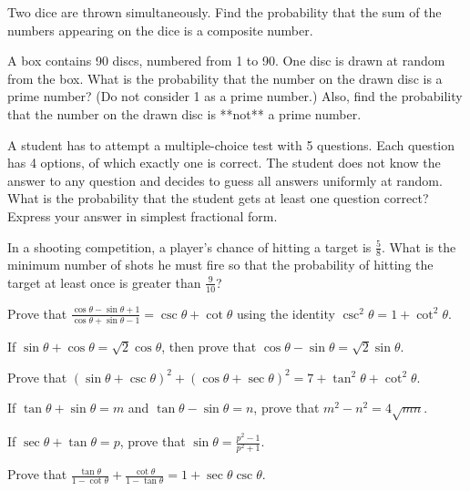 \documentclass[12pt,a4paper]{exam}
\begin{document}
\begin{questions}
\question[5] Two dice are thrown simultaneously. Find the probability that the sum of the numbers appearing on the dice is a composite number.
\vspace{0.15cm}

\question[5] A box contains 90 discs, numbered from 1 to 90. One disc is drawn at random from the box. What is the probability that the number on the drawn disc is a prime number? (Do not consider 1 as a prime number.) Also, find the probability that the number on the drawn disc is **not** a prime number.
\vspace{0.15cm}

\question[5] A student has to attempt a multiple-choice test with 5 questions. Each question has 4 options, of which exactly one is correct. The student does not know the answer to any question and decides to guess all answers uniformly at random. What is the probability that the student gets at least one question correct? Express your answer in simplest fractional form.
\vspace{0.15cm}

\question[5] In a shooting competition, a player's chance of hitting a target is $\frac{5}{8}$. What is the minimum number of shots he must fire so that the probability of hitting the target at least once is greater than $\frac{9}{10}$?
\vspace{0.15cm}

\question[5] Prove that $\frac{\cos \theta - \sin \theta + 1}{\cos \theta + \sin \theta - 1} = \csc \theta + \cot \theta$ using the identity $\csc^2 \theta = 1 + \cot^2 \theta$.
\vspace{0.15cm}

\question[5] If $\sin \theta + \cos \theta = \sqrt{2} \cos \theta$, then prove that $\cos \theta - \sin \theta = \sqrt{2} \sin \theta$.
\vspace{0.15cm}

\question[5] Prove that $(\sin \theta + \csc \theta)^2 + (\cos \theta + \sec \theta)^2 = 7 + \tan^2 \theta + \cot^2 \theta$.
\vspace{0.15cm}

\question[5] If $\tan \theta + \sin \theta = m$ and $\tan \theta - \sin \theta = n$, prove that $m^2 - n^2 = 4\sqrt{mn}$.
\vspace{0.15cm}

\question[5] If $\sec \theta + \tan \theta = p$, prove that $\sin \theta = \frac{p^2 - 1}{p^2 + 1}$.
\vspace{0.15cm}

\question[5] Prove that $\frac{\tan \theta}{1 - \cot \theta} + \frac{\cot \theta}{1 - \tan \theta} = 1 + \sec \theta \csc \theta$.
\vspace{0.15cm}


\end{questions}
\end{document}
